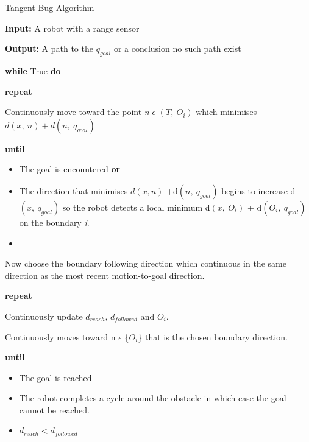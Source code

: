 \documentclass[../Head/Main.tex]{subfiles}
\begin{document}
\begin{Pseudo}{Tangent Bug Algorithm}{}
	\begin{Indentation}
		\item \textbf{Input:} A robot with a range sensor
		\item \textbf{Output:} A path to the $q_{goal}$	or a conclusion no such path exist 
		\begin{Indentation}
		
		\item \textbf{while} True \textbf{do}
			
			\begin{Indentation}
			
			\item \textbf{repeat}
			
				\begin{Indentation}

				\item Continuously move toward the point \textit{n} $\epsilon$ $\left(T,~O_i\right)$ which minimises $d(x,~n) + d \left(n,~q_{goal}\right)$
				
				\item \textbf{until}
				\begin{itemize}
					\item The goal is encountered \textbf{or}
					\item The direction that minimises ${d(x,n)}$ +d$\left(n,~q_{goal}\right)$ begins to increase d$\left(x,~q_{goal}\right)$ so the robot detects a local minimum d$\left(x,~O_i\right)$ + 
					d$\left(O_i,~q_{goal}\right)$ on the boundary \textit{i}.
					\item[ ]		
				\end{itemize}
				Now choose the boundary following direction which continuous in the same direction as the most recent motion-to-goal direction. 
				
				
				\item \textbf{repeat}
				\item Continuously update $d_{reach}$, $d_{followed}$ and $O_i$. 
				\item Continuously moves toward n $\epsilon$ \{$O_i$\} that is the chosen boundary direction.  
				
				\item \textbf{until}
				
				\begin{itemize}
				\item The goal is reached 
				\item The robot completes a cycle around the obstacle in which case the goal cannot be reached. 
				\item $d_{reach} < d_{followed}$
				

\end{itemize}
\end{Indentation}
\end{Indentation}
\end{Indentation}
\end{Indentation}
\end{Pseudo}
\end{document}
